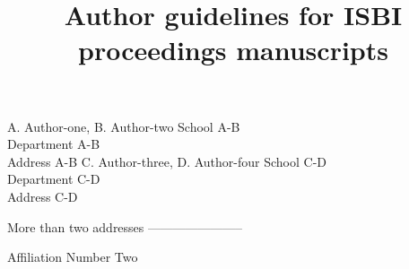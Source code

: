 \title{Author guidelines for ISBI proceedings manuscripts}
%


\twoauthors
  {A. Author-one, B. Author-two}
	{School A-B\\
	Department A-B\\
	Address A-B}
  {C. Author-three, D. Author-four}
	{School C-D\\
	Department C-D\\
	Address C-D}

 More than two addresses
 -----------------------

 \address{$^{\star}$ Affiliation Number One \\
     $^{\dagger}$}Affiliation Number Two
